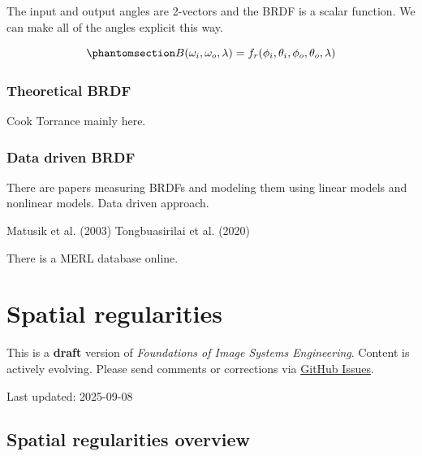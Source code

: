 \documentclass[
  letterpaper,
]{book}
\begin{document}
The input and output angles are 2-vectors and the BRDF is a scalar
function. We can make all of the angles explicit this way.

\begin{equation}\phantomsection\label{eq-BRDF2}{
B(\omega_i, \omega_o, \lambda) = f_r(\phi_i,\theta_i,\phi_o,\theta_o,\lambda)
}\end{equation}

\subsection{Theoretical BRDF}\label{theoretical-brdf}

Cook Torrance mainly here.

\subsection{Data driven BRDF}\label{data-driven-brdf}

There are papers measuring BRDFs and modeling them using linear models
and nonlinear models. Data driven approach.

Matusik et al. (2003) Tongbuasirilai et al. (2020)

There is a MERL database online.

\chapter{Spatial regularities}\label{sec-spatial-regularities}

\begin{tcolorbox}[enhanced jigsaw, colframe=quarto-callout-warning-color-frame, titlerule=0mm, rightrule=.15mm, opacitybacktitle=0.6, colback=white, leftrule=.75mm, coltitle=black, title=\textcolor{quarto-callout-warning-color}{\faExclamationTriangle}\hspace{0.5em}{Work in Progress}, bottomrule=.15mm, colbacktitle=quarto-callout-warning-color!10!white, breakable, left=2mm, bottomtitle=1mm, toptitle=1mm, opacityback=0, arc=.35mm, toprule=.15mm]

This is a \textbf{draft} version of \emph{Foundations of Image Systems
Engineering}. Content is actively evolving. Please send comments or
corrections via \href{https://github.com/wandell/FISE-git/issues}{GitHub
Issues}.

Last updated: 2025-09-08

\end{tcolorbox}

\section{Spatial regularities
overview}\label{sec-spatial-regularities-overview}
\end{document}
